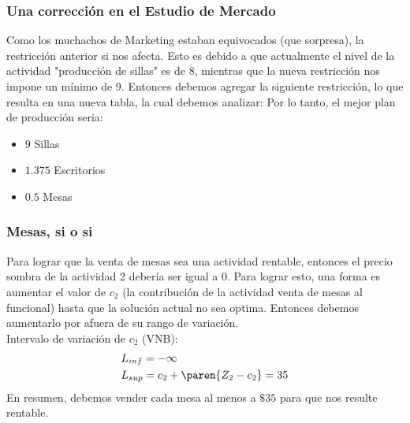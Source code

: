 \begin{homeworkProblem}[1][Dakota]
\subsubsection{Una corrección en el Estudio de Mercado}
Como los muchachos de Marketing estaban equivocados (que sorpresa), la restricción anterior si nos afecta. Esto es debido a que actualmente el nivel de la actividad "producción de sillas" es de 8, mientras que la nueva restricción nos impone un mínimo de 9.
Entonces debemos agregar la siguiente restricción,
lo que resulta en una nueva tabla, la cual debemos analizar:
\pagebreak
Por lo tanto, el mejor plan de producción seria:
\begin{itemize}
	\item $9$ Sillas
	\item $1.375$ Escritorios
	\item $0.5$ Mesas
\end{itemize}


\subsubsection{Mesas, si o si}
Para lograr que la venta de mesas sea una actividad rentable, entonces el precio sombra de la actividad 2 debería ser igual a $0$. Para lograr esto, una forma es aumentar el valor de $c_2$ (la contribución de la actividad venta de mesas al funcional) hasta que la solución actual no sea optima. Entonces debemos aumentarlo por afuera de su rango de variación. \\
Intervalo de variación de $c_2$ (VNB):
\begin{align*}
  &L_{inf} = -\infty \\
  &L_{sup} = c_2 + \paren{Z_2 - c_2} = 35  
\end{align*}
En resumen, debemos vender cada mesa al menos a $\$35$ para que nos resulte rentable.
\end{homeworkProblem}